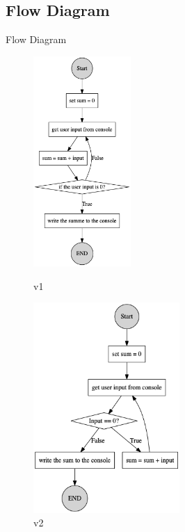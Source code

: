 \documentclass[handout, navsym]{tum-presentation}
\numberwithin{equation}{section}
\begin{document}
\subsection{Flow Diagram}
\begin{frame}{Flow Diagram}
\begin{figure}[htbp]
\centering
\begin{minipage}[t]{0.48\textwidth}
\centering
\includegraphics[height=8cm]{p1-1.png}
\caption{v1}
\end{minipage}
\begin{minipage}[t]{0.48\textwidth}
\centering
\includegraphics[height=8cm]{p1-2.png}
\caption{v2}
\end{minipage}
\end{figure}
\end{frame}
\end{document}
